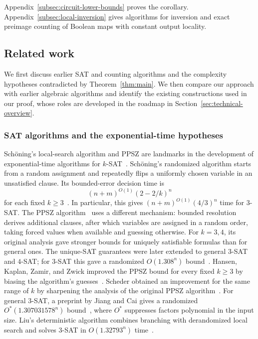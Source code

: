 \documentclass[11pt,reqno]{amsart}
\numberwithin{equation}{section}
\theoremstyle{definition}\newtheorem{definition}[theorem]{Definition}
\theoremstyle{remark}\newtheorem{remark}[theorem]{Remark}
\renewcommand{\ge}{\geqslant}
\begin{document}
Appendix~\ref{subsec:circuit-lower-bounds} proves the corollary.
Appendix~\ref{subsec:local-inversion} gives algorithms for inversion
and exact preimage counting of Boolean maps with constant output locality.

\subsection{Related work}\label{sec:related}
We first discuss earlier SAT and counting algorithms and the
complexity hypotheses contradicted by Theorem~\ref{thm:main}.
We then compare our approach with earlier algebraic algorithms and
identify the existing constructions used in our proof, whose roles
are developed in the roadmap in
Section~\ref{sec:technical-overview}.

\subsubsection{SAT algorithms and the exponential-time hypotheses}\label{subsec:related-sat}
Sch\"oning's local-search algorithm and PPSZ are landmarks in the
development of exponential-time algorithms for $k$-SAT~\cite{Schon99,PPSZ05}.
Sch\"oning's randomized algorithm starts from a random assignment
and repeatedly flips a uniformly chosen variable in an unsatisfied clause. Its
bounded-error decision time is
\[
 (n+m)^{O(1)}(2-2/k)^n
\]
for each fixed $k\ge3$~\cite[Section~2]{Schon99}.
In particular, this gives $(n+m)^{O(1)}(4/3)^n$ time for $3$-SAT.
The PPSZ algorithm~\cite{PPSZ05} uses a different mechanism: bounded resolution derives
additional clauses, after which variables are assigned in a random
order, taking forced values when available and guessing
otherwise. For $k=3,4$, its original analysis gave stronger
bounds for uniquely satisfiable formulas than for general ones.
The unique-SAT guarantees were later extended to general $3$-SAT and
$4$-SAT; for $3$-SAT this gave a randomized
$O(1.308^n)$ bound~\cite{Hertli14}.
Hansen, Kaplan, Zamir, and Zwick improved the PPSZ bound for every
fixed $k\ge3$ by biasing the algorithm's guesses~\cite{HKZZ19}.
Scheder obtained an improvement for the same range of $k$ by sharpening
the analysis of the original PPSZ algorithm~\cite[Theorem~1.5]{Scheder24}.
For general $3$-SAT, a preprint by Jiang and Cai gives a randomized
$O^*(1.307031578^n)$ bound~\cite[Corollary~1.2]{JC26}, where $O^*$
suppresses factors polynomial in the input size. Liu's deterministic
algorithm combines branching with derandomized local search and solves
$3$-SAT in $O(1.32793^n)$ time~\cite[Theorem~21]{Liu18}.
\end{document}
